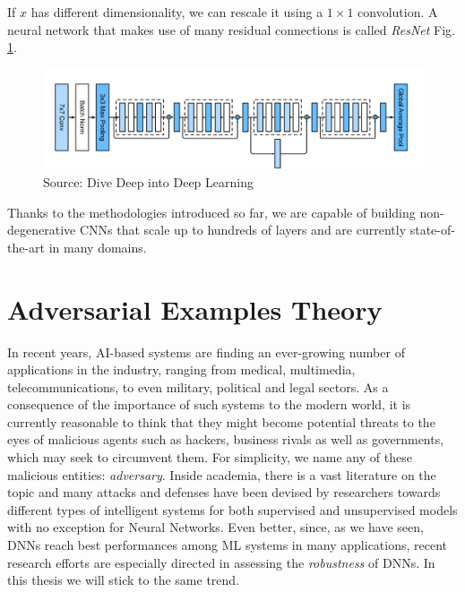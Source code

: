 \documentclass[LaM,binding=0.6cm]{./packages/sapthesis/sapthesis}
\begin{document}
        If $x$ has different dimensionality, we can rescale it using a $ 1 \times 1 $ convolution. A neural network 
        that makes use of many residual connections is called \textit{ResNet} Fig. \ref{fig:resnet}. 
        \begin{figure}[h]
            \centering
            \includegraphics[scale=0.30]{resnet}
            \caption{Source: Dive Deep into Deep Learning}
            \label{fig:resnet}
        \end{figure}

        Thanks to the methodologies introduced so far, we are capable of building non-degenerative CNNs that scale up to hundreds of layers
        and are currently state-of-the-art in many domains.


    \chapter{Adversarial Examples Theory}
    \label{chap:3}

    In recent years, AI-based systems are finding an ever-growing number of applications in the industry, ranging from medical, multimedia, telecommunications, to even military, political and legal sectors. 
    As a consequence of the importance of such systems to the modern world, it is currently reasonable to think that they might become potential threats to the eyes of
    malicious agents such as hackers, business rivals as well as governments, which may seek to circumvent them. For simplicity, we name any of these malicious entities: \textit{adversary}. 
    Inside academia, there is a vast literature on the topic and many attacks and defenses have been devised by researchers towards different types of intelligent systems for both supervised \cite{szegedy2013-intriguing}
    and unsupervised models \cite{unsupervised_adv} with no exception for Neural Networks. Even better, since, as we have seen, DNNs reach best performances among ML systems 
    in many applications, recent research efforts are especially directed in assessing the \textit{robustness} of DNNs. In this thesis we will stick to the same trend.
\end{document}
